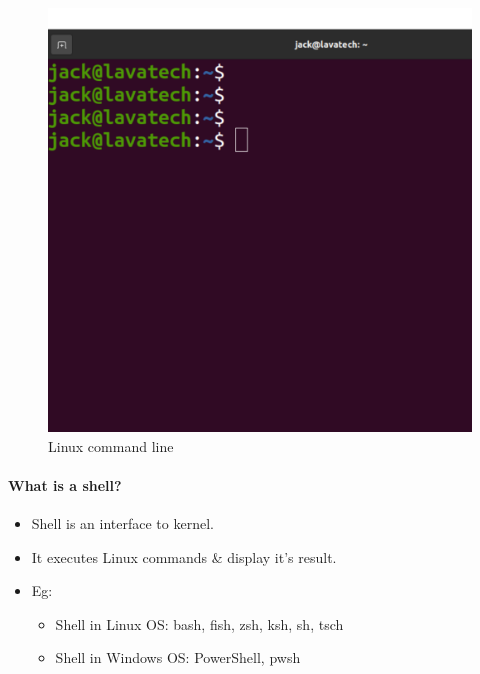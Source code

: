 \begin{flushleft}
\begin{itemize}
		\begin{figure}[h!]
			\centering
			\includegraphics[scale=.18]{content/chapter1/images/commandline.png}
			\caption{Linux command line}
			\label{fig:commandline}
		\end{figure}	
	\end{itemize}
	\paragraph{What is a shell?}
	\begin{itemize}
		\item Shell is an interface to kernel.
		\item It executes Linux commands \& display it's result.
		\item Eg:
		\begin{itemize}
			\item Shell in Linux OS: bash, fish, zsh, ksh, sh, tsch
			\item Shell in Windows OS: PowerShell, pwsh
		\end{itemize}
	\end{itemize}		
\end{flushleft}

\newpage
